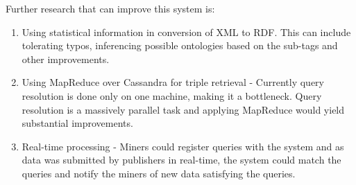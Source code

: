 \documentclass[journal]{IEEEtran}
\begin{document}
Further research that can improve this system is:
\begin{enumerate}

    \item Using statistical information in conversion of XML to RDF. This can
        include tolerating typos, inferencing possible ontologies based on the
        sub-tags and other improvements.

    \item Using MapReduce over Cassandra for triple retrieval - Currently query
        resolution is done only on one machine, making it a bottleneck. Query
        resolution is a massively parallel task and applying
        MapReduce\cite{Dean04mapreduce:simplified}\cite{hus09hadoop} would
        yield substantial improvements.

    \item Real-time processing - Miners could register queries with the system
        and as data was submitted by publishers in real-time, the system could
        match the queries and notify the miners of new data satisfying the
        queries\cite{Aba03aurora}.
\end{enumerate}
\end{document}
